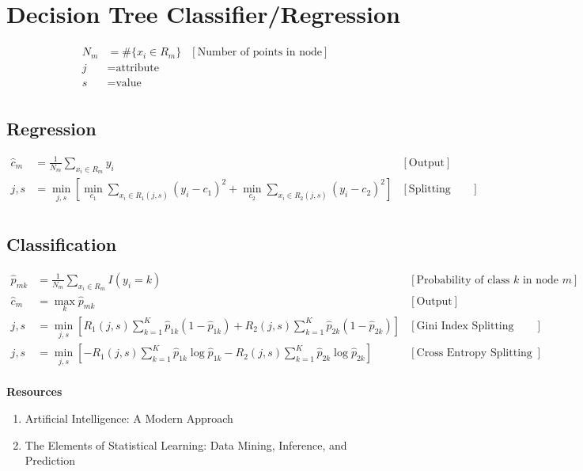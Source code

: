 \section{Decision Tree Classifier/Regression}

\begin{align*}
   N_m &= \#\{x_i \in R_m\} & [\text{Number of points in node}]\\
   j &= \text{attribute} &\\
   s &= \text{value} &\\
\end{align*}

\subsection{Regression}
\begin{align*}
    \hat{c}_m &= \frac{1}{N_m} \sum_{x_i \in R_m} y_i & [\text{Output}]\\
    j, s &= \min_{j, s} \left[\min_{c_1} \sum_{x_i \in R_1 (j, s)} (y_i - c_1)^2 + \min_{c_2} \sum_{x_i \in R_2 (j, s)} (y_i - c_2)^2\right] & [\text{Splitting Condition}]\\
\end{align*}

\subsection{Classification}
\begin{align*}
    \hat{p}_{mk} &= \frac{1}{N_m} \sum_{x_i \in R_m} I(y_i = k) & [\text{Probability of class $k$ in node $m$}]\\
    \hat{c}_m &=  \max_{k} \hat{p}_{mk} & [\text{Output}]\\
    j, s &= \min_{j, s} \left[ R_1 (j, s)\sum^{K}_{k=1} \hat{p}_{1k} (1 - \hat{p}_{1k}) + R_2 (j, s)\sum^{K}_{k=1} \hat{p}_{2k} (1 - \hat{p}_{2k}) \right] & [\text{Gini Index Splitting condition}]\\
    j, s &= \min_{j, s} \left[ -R_1 (j, s)\sum^{K}_{k=1} \hat{p}_{1k} \log \hat{p}_{1k} - R_2 (j, s)\sum^{K}_{k=1} \hat{p}_{2k} \log \hat{p}_{2k} \right] & [\text{Cross Entropy Splitting condition}]\\
\end{align*}

\textbf{Resources}
\begin{enumerate}
    \item Artificial Intelligence: A Modern Approach~\cite{russell1}
    \item The Elements of Statistical Learning: Data Mining, Inference, and Prediction~\cite{hastie1}
\end{enumerate}
